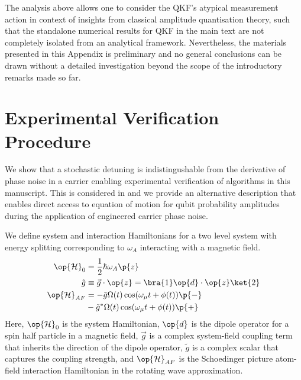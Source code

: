 The analysis above allows one to consider the QKF's atypical measurement action in context of insights from classical amplitude quantisation theory, such that the standalone numerical results for QKF in the main text are not completely isolated from an analytical framework. Nevertheless, the materials presented in this Appendix is preliminary and no general conclusions can be drawn without a detailed investigation beyond the scope of the introductory remarks made so far. 




\clearpage
\section{Experimental Verification Procedure \label{sec:app:exptverfication}}

We show that a stochastic detuning is indistingushable from the derivative of phase noise in a carrier enabling experimental verification of algorithms in this manuscript.
This is considered in \cite{soare2014} and we provide an alternative description that enables direct access to equation of motion for qubit probability amplitudes during the application of engineered carrier phase noise. 

We define system and interaction Hamiltonians for a two level system with energy splitting corresponding to $\omega_A$  interacting with a magnetic field. 
\\
\begin{align}
\op{\mathcal{H}}_0 &= \frac{1}{2} \hbar \omega_A \p{z} \\
\tilde{g} & \equiv \vec{g} \cdot \op{z} = \bra{1} \op{d} \cdot \op{z} \ket{2} \\
\op{\mathcal{H}}_{AF} & = -\tilde{g} \Omega(t)  \cos(\omega_\mu t + \phi(t)) \p{-} \\
& - \tilde{g}^* \Omega(t)  \cos(\omega_\mu t + \phi(t)) \p{+}
\end{align} Here, $\op{\mathcal{H}}_0$ is the system Hamiltonian, $\op{d}$ is the dipole operator for a spin half particle in a magnetic field, $\vec{g}$ is a complex system-field coupling term that inherits the direction of the dipole operator, $\tilde{g}$ is a complex scalar that captures the coupling strength, and $\op{\mathcal{H}}_{AF}$ is the Schoedinger picture atom-field interaction Hamiltonian in the rotating wave approximation.

